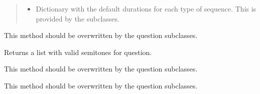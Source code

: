 \documentclass[letterpaper,10pt,english]{sphinxmanual}
\begin{document}
\begin{fulllineitems}
\begin{fulllineitems}
\begin{quote}
\begin{description}
\begin{itemize}
\item {} 
 \textendash{} Dictionary with the default durations for
each type of sequence. This is provided by the subclasses.

\end{itemize}

\end{description}\end{quote}

\end{fulllineitems}


\begin{fulllineitems}
\label{\detokenize{birdears:birdears.questionbase.QuestionBase.check_question}}
This method should be overwritten by the question subclasses.

\end{fulllineitems}


\begin{fulllineitems}
\label{\detokenize{birdears:birdears.questionbase.QuestionBase.get_valid_semitones}}
Returns a list with valid semitones for question.

\end{fulllineitems}


\begin{fulllineitems}
\label{\detokenize{birdears:birdears.questionbase.QuestionBase.make_question}}
This method should be overwritten by the question subclasses.

\end{fulllineitems}


\begin{fulllineitems}
\label{\detokenize{birdears:birdears.questionbase.QuestionBase.make_resolution}}
This method should be overwritten by the question subclasses.


\end{fulllineitems}
\end{fulllineitems}
\end{document}
